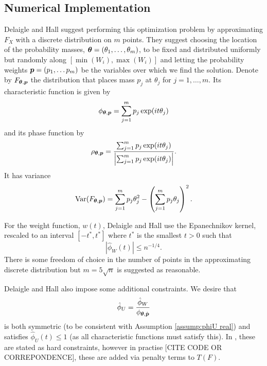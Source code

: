 	\subsection{Numerical Implementation}

	Delaigle and Hall suggest performing this optimization problem by approximating $F_X$ with a discrete distribution on $m$ points. They suggest choosing the location of the probability masses, ${\bm{{\theta}}} = (\theta_1, \dots, \theta_m)$, to be fixed and distributed uniformly but randomly along $[\min(W_i), \max(W_i)]$ and letting the probability weights ${\bm{{p}}} = (p_1, \dots p_m)$ be the variables over which we find the solution. Denote by $F_{{\bm{{\theta}}}, {\bm{{p}}}}$ the distribution that places mass $p_j$ at $\theta_j$ for $j = 1,\dots, m$. Its characteristic function is given by
	\begin{equation}
		\phi_{{\bm{{\theta}}}, {\bm{{p}}}} = \sum_{j = 1}^m p_j \exp(it\theta_j)
	\end{equation}
	and its phase function by
	\begin{equation}
		\rho_{{\bm{{\theta}}}, {\bm{{p}}}} = \frac{ \sum_{j = 1}^m p_j \exp(it\theta_j)}{\left| \sum_{j = 1}^m p_j \exp(it\theta_j)\right|}.
	\end{equation}
	It has variance
	\begin{equation}
		\mathrm{Var}(F_{{\bm{{\theta}}}, {\bm{{p}}}}) = \sum_{j = 1}^m p_j \theta_j^2 - \left( \sum_{j=1}^m p_j \theta_j \right)^2.
	\end{equation}

	For the weight function, $w(t)$, Delaigle and Hall use the Epanechnikov kernel, rescaled to an interval $[-t^*, t^*]$ where $t^*$ is the smallest $t > 0$ such that 
	\begin{equation}
	\label{eq:define t star}
		\left|\hat{\phi}_W(t)\right| \leq n^{-1/4}.
	\end{equation}
	There is some freedom of choice in the number of points in the approximating discrete distribution but $m = 5\sqrt{n}$ is suggested as reasonable.

	Delaigle and Hall also impose some additional constraints. We desire that 
	\begin{equation}
		\hat{\phi}_U = \frac{\hat{\phi}_W}{\phi_{{\bm{{\theta}}}, \hat{{\bm{{p}}}}}}
	\end{equation}
	is both symmetric (to be consistent with Assumption \ref{assump:phiU real}) and satisfies $\hat{\phi}_U(t) \leq 1$ (as all characteristic functions must satisfy this). In \cite{Delaigle2016-la}, these are stated as hard constraints, however in practise [CITE CODE OR CORREPONDENCE], these are added via penalty terms to $T(F)$.

